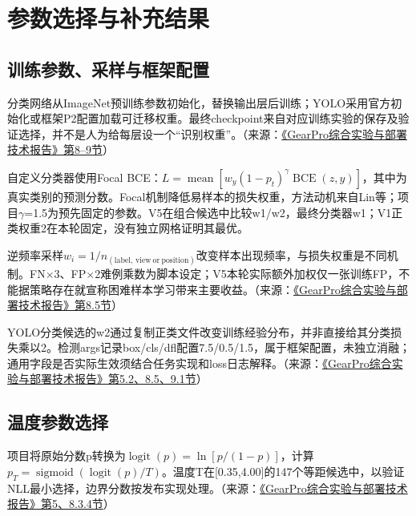 
\FloatBarrier{}\section{参数选择与补充结果}
\FloatBarrier{}\subsection{训练参数、采样与框架配置}
分类网络从ImageNet预训练参数初始化，替换输出层后训练；YOLO采用官方初始化或框架P2配置加载可迁移权重。最终checkpoint来自对应训练实验的保存及验证选择，并不是人为给每层设一个“识别权重”。（来源：\protect\href{run:../GearPro_综合技术报告_Markdown含配图/GearPro_综合实验与部署技术报告.md}{《GearPro综合实验与部署技术报告》第8--9节}）

自定义分类器使用Focal BCE：$L=\operatorname{mean}[w_y(1-p_t)^\gamma\operatorname{BCE}(z,y)]$，其中为真实类别的预测分数。Focal机制降低易样本的损失权重，方法动机来自Lin等\cite{ref13}；项目\ensuremath{\gamma}=1.5为预先固定的参数。V5在组合候选中比较w1/w2，最终分类器w1；V1正类权重2在本轮固定，没有独立网格证明其最优。

逆频率采样$w_i=1/n_{(\mathrm{label},\,\mathrm{view\ or\ position})}$改变样本出现频率，与损失权重是不同机制。FN\ensuremath{\times}3、FP\ensuremath{\times}2难例乘数为脚本设定；V5本轮实际额外加权仅一张训练FP，不能据策略存在就宣称困难样本学习带来主要收益。（来源：\protect\href{run:../GearPro_综合技术报告_Markdown含配图/GearPro_综合实验与部署技术报告.md}{《GearPro综合实验与部署技术报告》第8.5节}）

YOLO分类候选的w2通过复制正类文件改变训练经验分布，并非直接给其分类损失乘以2。检测args记录box/cls/dfl配置7.5/0.5/1.5，属于框架配置，未独立消融；通用字段是否实际生效须结合任务实现和loss日志解释。（来源：\protect\href{run:../GearPro_综合技术报告_Markdown含配图/GearPro_综合实验与部署技术报告.md}{《GearPro综合实验与部署技术报告》第5.2、8.5、9.1节}）

\FloatBarrier{}\subsection{温度参数选择}
项目将原始分数p转换为$\operatorname{logit}(p)=\ln[p/(1-p)]$，计算$p_T=\operatorname{sigmoid}(\operatorname{logit}(p)/T)$。温度T在[0.35,4.00]的147个等距候选中，以验证NLL最小选择，边界分数按发布实现处理。（来源：\protect\href{run:../GearPro_综合技术报告_Markdown含配图/GearPro_综合实验与部署技术报告.md}{《GearPro综合实验与部署技术报告》第5、8.3.4节}）

